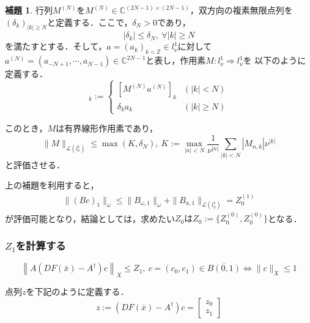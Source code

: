 \documentclass[11pt,a4paper]{jsarticle}
\theoremstyle{definition}
\newtheorem{lmm}{補題}
\begin{document}
\begin{lmm}
  行列$M^{(N)}$を$M^{(N)} \in \mathbb{C}^{(2N-1) \times (2N-1)}$，双方向の複素無限点列を$(\delta_k)_{|k| \geq N}$と定義する．ここで，$\delta_N > 0$であり，
  \begin{equation*}
    |\delta_k| \leq \delta_N,\ \forall |k| \geq N
  \end{equation*}
  を満たすとする．そして，$a=(a_k)_{k<\mathbb{Z}} \in l_\nu^1$に対して$a^{(N)}=(a_{-N+1},\cdots,a_{N-1})\in \mathbb{C}^{2N-1}$と表し，作用素$M:l_\nu^1 \Rightarrow l_\nu^1$を
  以下のように定義する．
  \begin{equation*}
    [Ma]_k := \begin{cases}
      [M^{(N)}a^{(N)}]_k & (|k|<N)     \\
      \delta_k a_k       & (|k|\geq N)
    \end{cases}
  \end{equation*}

  このとき，$M$は有界線形作用素であり，
  \begin{equation*}
    \|M\|_{\mathcal{L}(l_\nu^1)} \leq \max \left( K,\delta_N \right),\ K:=\max_{|n|<N} \frac{1}{\nu^{|n|}} \sum_{|k|<N} |M_{n,k}| \nu^{|k|}
  \end{equation*}
  と評価させる．
\end{lmm}

上の補題を利用すると，
\begin{eqnarray}
  \|(Bc)_1\|_\omega \leq \|B_{\omega,1}\|_\omega + \|B_{a,1}\|_{\mathcal{L}(l_\nu^1)} = Z_0^{(1)}
\end{eqnarray}
が評価可能となり，結論としては，求めたい$Z_0はZ_0:=\{Z_0^{(0)},Z_0^{(0)}\}$となる．

\subsubsection{$Z_1$を計算する}
\begin{equation*}
  \left\| A \left( DF \left( \bar{x} \right) - A^\dagger \right) c \right\|_X \leq Z_1,\ c=(c_0,c_1) \in \overline{B(0,1)} \Leftrightarrow \|c\|_X \leq 1
\end{equation*}

点列$z$を下記のように定義する．
\begin{equation}
  z := \left(DF(\bar{x})-A^\dagger\right)c = \begin{bmatrix}
    z_0 \\
    z_1
  \end{bmatrix}
\end{equation}
\end{document}
